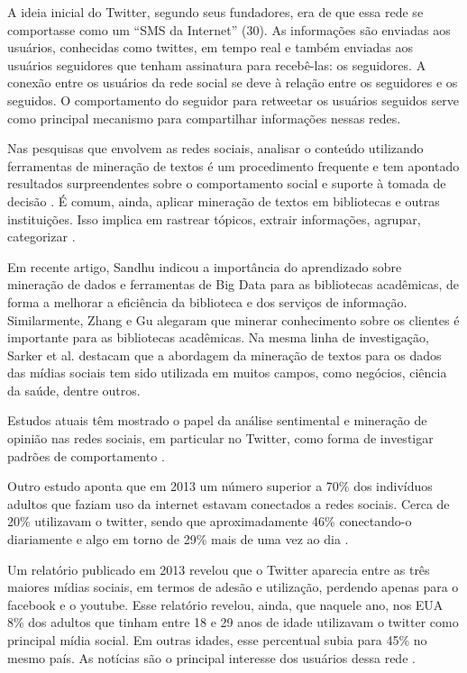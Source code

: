 A ideia inicial do Twitter, segundo seus fundadores, era de que essa rede se comportasse como um “SMS da Internet” (30). As informações são enviadas aos usuários, conhecidas como twittes, em tempo real e também enviadas aos usuários seguidores que tenham assinatura para recebê-las: os seguidores. A conexão entre os usuários da rede social se deve à relação entre os seguidores e os seguidos. O comportamento do seguidor para retweetar os usuários seguidos serve como principal mecanismo para compartilhar informações nessas redes.

Nas pesquisas que envolvem as redes sociais, analisar o conteúdo utilizando ferramentas de mineração de textos é um procedimento frequente e tem apontado resultados surpreendentes sobre o comportamento social e suporte à tomada de decisão \cite{abrahams2015integrated}. É comum, ainda, aplicar mineração de textos em bibliotecas e outras instituições. Isso implica em rastrear tópicos, extrair informações, agrupar, categorizar \cite{fan2006tapping}.

Em recente artigo, Sandhu \cite{sandhu2015scheduling} indicou a importância do aprendizado sobre mineração de dados e ferramentas de Big Data para as bibliotecas acadêmicas, de forma a melhorar a eficiência da biblioteca e dos serviços de informação. Similarmente, Zhang e Gu \cite{zhang2011text} alegaram que minerar conhecimento sobre os clientes é importante para as bibliotecas acadêmicas. Na mesma linha de investigação, Sarker et al. \cite{sarker2015utilizing} destacam que a abordagem da mineração de textos para os dados das mídias sociais tem sido utilizada em muitos campos, como negócios, ciência da saúde, dentre outros. 

Estudos atuais têm mostrado o papel da análise sentimental e mineração de opinião nas redes sociais, em particular no Twitter, como forma de investigar padrões de comportamento \cite{pak2010twitter} \cite{kumar2012sentiment}.


Outro estudo aponta que em 2013 um número superior a 70\% dos indivíduos adultos que faziam uso da internet estavam conectados a redes sociais. Cerca de 20\% utilizavam o twitter, sendo que aproximadamente 46\% conectando-o diariamente e algo em torno de 29\% mais de uma vez ao dia \cite{madden2013teens}. 

Um relatório publicado em 2013 revelou que o Twitter aparecia entre as três maiores mídias sociais, em termos de adesão e utilização, perdendo apenas para o facebook e o youtube. Esse relatório revelou, ainda, que naquele ano, nos EUA 8\% dos adultos que tinham entre 18 e 29 anos de idade utilizavam o twitter como principal mídia social. Em outras idades, esse percentual subia para 45\% no mesmo país. As notícias são o principal interesse dos usuários dessa rede \cite{mitchell2013news}. 

